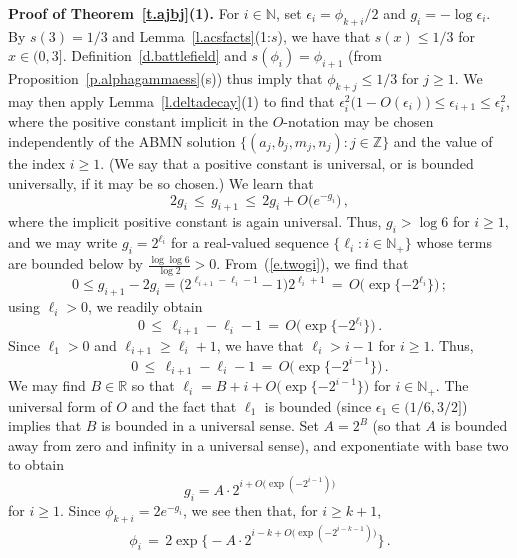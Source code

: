 \documentclass[letterpaper,11pt,oneside,reqno]{amsbook}
\newcommand{\e}[0]{\epsilon}
\newcommand{\N}{\ensuremath{\mathbb{N}}}
\newcommand{\R}{\ensuremath{\mathbb{R}}}
\newcommand{\Z}{\ensuremath{\mathbb{Z}}}
\numberwithin{figure}{chapter}
\theoremstyle{definition}
\theoremstyle{definition}
\theoremstyle{definition}
\theoremstyle{definition}
\theoremstyle{definition}
\newcommand{\nwithzero}{\N}
\newcommand{\nwithoutzero}{\N_+}
\newcommand{\macell}{\ell}
\newcommand{\macphi}{\phi}
\begin{document}
{\bf Proof of Theorem~\ref{t.ajbj}(1).} For $i \in \nwithzero$, set $\e_i = \macphi_{k+i}/2$ and $g_i = - \log \e_i$. 
By $s(3) = 1/3$ and Lemma~\ref{l.acsfacts}(1:$s$), we have that $s(x) \leq 1/3$ for $x \in (0,3]$. Definition~\ref{d.battlefield} and  $s(\macphi_i) =\macphi_{i+1}$ (from Proposition~\ref{p.alphagammaess}(s)) thus imply that
$\macphi_{k+j} \leq 1/3$ for $j \geq 1$. We may then apply
Lemma~\ref{l.deltadecay}(1) to find that $\e_i^2 \big( 1 - O(\e_i) \big) \leq \e_{i+1} \leq \e_i^2$, 
where the positive constant implicit in the $O$-notation may be chosen independently of the ABMN solution $\big\{ (a_j,b_j,m_j,n_j):j \in \Z \big\}$
and the value of the index $i \geq 1$. (We say that a positive constant is universal, or is bounded universally, if it may be so chosen.) We learn that
\begin{equation}\label{e.twogi}
 2 g_i \, \leq \, g_{i+1} \, \leq \, 2 g_i + O\big(e^{-g_i} \big) \, ,
\end{equation}
where the implicit positive constant is again universal.
Thus, $g_i > \log 6$ for $i \geq 1$, and we may write $g_i = 2^{\macell_i}$ for a real-valued sequence $\{ \macell_i: i \in \nwithoutzero \}$ whose terms are bounded below by $\tfrac{\log \log 6}{\log 2} > 0$. From~(\ref{e.twogi}), we find that
$$
 0 \leq g_{i+1} - 2g_i = \big( 2^{\macell_{i+1} - \macell_i - 1} - 1 \big) 2^{\macell_i +1}   \, = \, O \big( \exp \{ - 2^{\macell_i} \} \big) \, ;
$$
using $\macell_i  > 0$, we readily obtain
$$
  0 \, \leq \, \macell_{i+1} - \macell_i - 1  \, = \, O \big( \exp \{ - 2^{\macell_i} \} \big) \, .
$$
Since $\macell_1 > 0$ and $\macell_{i+1} \geq \macell_i +1$, we have that $\macell_i > i -1$ for $i \geq 1$. Thus,
$$
   0 \, \leq \, \macell_{i+1} - \macell_i - 1  \, = \, O \big( \exp \{ - 2^{i-1}  \} \big) \, .
$$
We may find $B \in \R$ so that $\macell_i = B + i + O \big( \exp \{ - 2^{i-1}  \} \big)$ for $i \in \nwithoutzero$. 
The universal form of $O$ and the fact that $\macell_1$ is bounded (since $\e_1 \in (1/6,3/2]$)
implies that $B$ is bounded in a universal sense.
Set $A = 2^B$ (so that $A$ is bounded away from zero and infinity in a universal sense), and exponentiate with base two to obtain
$$
 g_i = A \cdot 2^{i + O\big(\exp ( -2^{i-1} ) \big)} 
$$
for $i \geq 1$. Since $\phi_{k+i} = 2e^{-g_i}$, we see then that, for $i \geq k+1$,
\begin{equation}\label{e.deltaiformula}
 \macphi_i \, = \, 2 \exp \Big\{ -A \cdot 2^{{i-k} +O\big(\exp ( -2^{i-k-1} ) \big)} \Big\} \, .
\end{equation}
\end{document}
